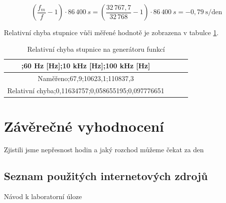 \documentclass[a4paper,12pt]{article}   %
\begin{document}
\begin{equation}
  \left(\frac{f_m}{f}-1\right)\cdot 86\,400~s = \left(\frac{32\,767,7}{32\,768}-1\right)\cdot 86\,400~s = -0,79~\textrm{s/den}
  \label{eq:presnost_T}
\end{equation}

Relativní chyba stupnice vůči měřené hodnotě je zobrazena v tabulce \ref{tab:chyba}.
\begin{table}[h!]
  \centering
  \begin{tabular}{|c|c|c|c|}
    ;60 Hz [Hz];10 kHz [Hz];100 kHz [Hz]\\\hline\hline
    Naměřeno;67,9;10623,1;110837,3\\\hline
    Relativní chyba;0,11634757;0,058655195;0,097776651\\\hline
  \end{tabular}
  \label{tab:chyba}
  \caption{Relativní chyba stupnice na generátoru funkcí}
\end{table}

\section{Závěrečné vyhodnocení}
Zjistili jsme nepřesnost hodin a jaký rozchod můžeme čekat za den

\clearpage
\renewcommand{\refname}{Seznam použité literatury a~zdrojů informací} 

\begin{thebibliography}{99}

\subsection*{Seznam použitých internetových zdrojů}
     Návod k laboratorní úloze
    
\end{thebibliography}
\end{document}
